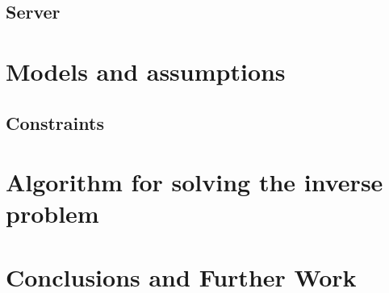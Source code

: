 \documentclass[english]{article}\usepackage[]{graphicx}\usepackage[]{color}
\begin{document}
\subsection{Server}
\begin{comment}
Description of testbed, hardware, software, logic
Sid's flowchart
\end{comment}

\section{Models and assumptions}
\subsection{Constraints}
\begin{comment}
Description of constraints for our problem
limited bandwidth, data storage
Also assumptions about simple piecewise environments
\end{comment}

\section{Algorithm for solving the inverse problem}
\begin{comment}
\end{comment}
\section{Conclusions and Further Work}
\end{document}
